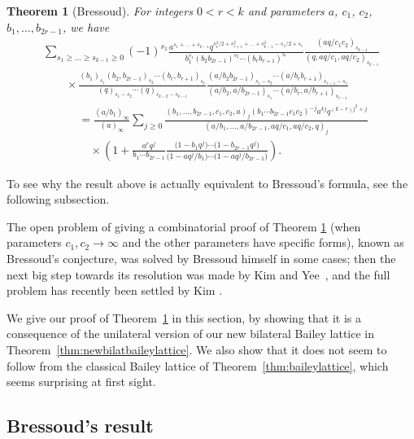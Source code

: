 \documentclass[pdftex]{sigma}
\numberwithin{equation}{section}
\newtheorem{Theorem}{Theorem}[section]
\begin{document}
\begin{Theorem}[Bressoud]\label{thm:Bressoud}
For integers $0<r<k$ and parameters $a$, $c_1$, $c_2$, $b_1,\dots, b_{2r-1}$, we have
\begin{gather}
\sum_{s_1\geq\dots\geq s_{k-1}\geq0}(-1)^{s_1}\frac{a^{s_1+\dots+s_{k-1}}q^{s_1^2/2+s_{r+1}^2+\dots+s_{k-1}^2-s_{1}/2+s_{r}}}{b_1^{s_1}(b_2b_{2r-1})^{s_2} \cdots(b_{r}b_{r+1})^{s_{r}}}\frac{(aq/c_1c_2)_{s_{k-1}}}{(q,aq/c_1,aq/c_2)_{s_{k-1}}}\nonumber\\
\qquad\times\frac{(b_1)_{s_1}(b_2,b_{2r-1})_{s_2}\cdots(b_{r},b_{r+1})_{s_{r}}}{(q)_{s_1-s_2}\cdots(q)_{s_{k-2}-s_{k-1}}}
\frac{(a/b_2b_{2r-1})_{s_1-s_2}\cdots(a/b_{r}b_{r+1})_{s_{r-1}-s_{r}}}{(a/b_2,a/b_{2r-1})_{s_1}\cdots(a/b_{r},a/b_{r+1})_{s_{r-1}}}\nonumber\\
\phantom{\qquad\times}{}=\frac{(a/b_1)_\infty}{(a)_\infty}\sum_{j\geq0}\frac{(b_1,\dots,b_{2r-1},c_1,c_2,a)_j(b_1\cdots b_{2r-1}c_1c_2)^{-j}a^{kj}q^{(k-r)j^2+j}}{(a/b_1,\dots,a/b_{2r-1},aq/c_1,aq/c_2,q)_j}\nonumber\\
\phantom{\qquad\times=}{}\times\left(1+\frac{a^{r}q^{j}}{b_1\cdots b_{2r-1}}\frac{\bigl(1-b_1q^j\bigr)\cdots\bigl(1-b_{2r-1} q^j\bigr)}{\bigl(1-aq^j/b_1\bigr)\cdots\bigl(1-aq^j/b_{2r-1}\bigr)}\right).\label{Bressoud2}
\end{gather}
\end{Theorem}
To see why the result above is actually equivalent to Bressoud's formula, see the following subsection.

The open problem of giving a combinatorial proof of Theorem \ref{thm:Bressoud} (when parameters $c_1,c_2\to\infty$ and the other parameters have specific forms), known as Bressoud's conjecture, was solved by Bressoud himself in some cases; then the next big step towards its resolution was made by Kim and Yee~\cite{KY}, and the full problem has recently been settled by Kim \cite{Ki}.

We give our proof of Theorem~\ref{thm:Bressoud} in this section, by showing that it is a consequence of the unilateral version of our new bilateral Bailey lattice in Theorem~\ref{thm:newbilatbaileylattice}. We also show that it does not seem to follow from the classical Bailey lattice of Theorem~\ref{thm:baileylattice}, which seems surprising at first sight.

\subsection{Bressoud's result}
\end{document}
